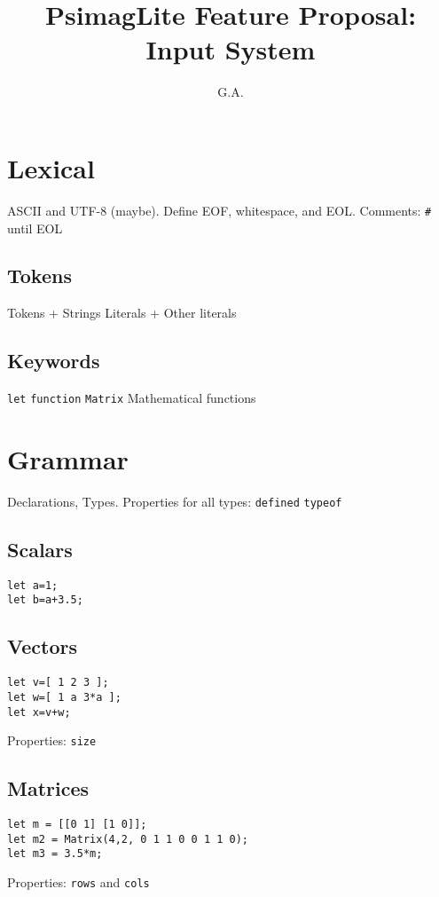 \documentclass[twocolumn]{article}
\begin{document}
\title{PsimagLite Feature Proposal:\\
Input System}
\author{G.A.}
\maketitle

\section{Lexical}
ASCII and UTF-8 (maybe).
Define EOF, whitespace, and EOL.
Comments: \verb!#! until EOL

\subsection{Tokens}
Tokens + Strings Literals + Other literals

\subsection{Keywords}
\verb!let! \verb!function! \verb!Matrix!
Mathematical functions

\section{Grammar}
Declarations, Types.
Properties for all types: \verb!defined! \verb!typeof!

\subsection{Scalars} 
\begin{verbatim}
let a=1;
let b=a+3.5;
\end{verbatim}
\subsection{Vectors} 
\begin{verbatim}
let v=[ 1 2 3 ];
let w=[ 1 a 3*a ];
let x=v+w;
\end{verbatim}
Properties: \verb!size!

\subsection{Matrices} 
\begin{verbatim}
let m = [[0 1] [1 0]];
let m2 = Matrix(4,2, 0 1 1 0 0 1 1 0);
let m3 = 3.5*m;
\end{verbatim}
Properties: \verb!rows! and \verb!cols!
\end{document}
